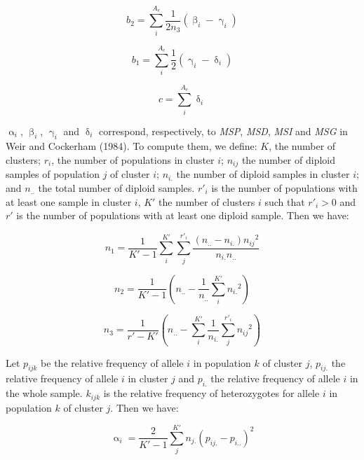 \documentclass{scrartcl}
\begin{document}
\begin{displaymath}
    b_2 = \sum_i^{A_e} \frac{1}{2 n_3} \left( \upbeta_i - \upgamma_i \right)
\end{displaymath}

\begin{displaymath}
    b_1 = \sum_i^{A_e} \frac{1}{2} \left( \upgamma_i - \updelta_i \right)
\end{displaymath}

\begin{displaymath}
    c = \sum_i^{A_e} \updelta_i
\end{displaymath}

$\upalpha_i$, $\upbeta_i$, $\upgamma_i$ and $\updelta_i$ correspond,
respectively, to \textit{MSP}, \textit{MSD}, \textit{MSI} and
\textit{MSG} in Weir and Cockerham (1984). To compute them, we define:
$K$, the number of clusters; $r_i$, the number of populations in cluster
$i$; $n_{ij}$ the number of diploid samples of population $j$ of cluster
$i$; $n_{i.}$ the number of diploid samples in cluster $i$; and $n_{..}$
the total number of diploid samples. $r'_i$ is the number of populations
with at least one sample in cluster $i$, $K'$ the number of clusters
$i$ such that $r'_i > 0$ and $r'$ is the number of populations with at
least one diploid sample. Then we have:

\begin{displaymath}
    n_1 = \frac{1}{K'-1} \sum_i^{K'} \sum_j^{r'_i} \frac{(n_{..} - n_{i.}) {n_{ij}}^2}{n_{i.}n_{..}}
\end{displaymath}

\begin{displaymath}
    n_2 = \frac{1}{K'-1} \left( n_{..} - \frac{1}{n_{..}} \sum_i^{K'} {n_{i.}}^2 \right)
\end{displaymath}

\begin{displaymath}
    n_3 = \frac{1}{r' - K'} \left( n_{..} - \sum_i^{K'} \frac{1}{n_{i.}} \sum_j^{r'_i} {n_{ij}}^2 \right)
\end{displaymath}

Let $p_{ijk}$ be the relative frequency of allele $i$ in population $k$
of cluster $j$, $p_{ij.}$ the relative frequency of allele $i$ in
cluster $j$ and $p_{i.}$ the relative frequency of allele $i$ in the
whole sample. $k_{ijk}$ is the relative frequency of heterozygotes for
allele $i$ in population $k$ of cluster $j$. Then we have:

\begin{displaymath}
    \upalpha_i = \frac{2}{K'-1} \sum_j^{K'} n_{j.} (p_{ij.} - p_{i..})^2
\end{displaymath}
\end{document}
